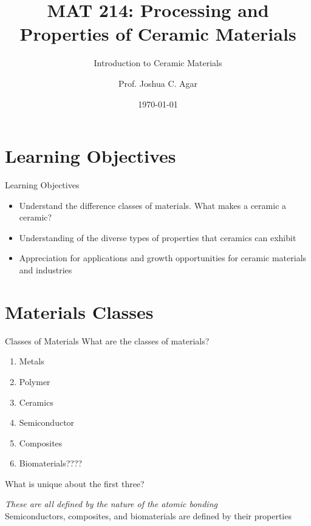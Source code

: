 \documentclass{libs/XJTLU_format}
\title[MAT 214 Spring 2022]{\textbf{MAT 214: Processing and Properties of Ceramic Materials}}
\subtitle{Introduction to Ceramic Materials}
\author{Prof. Joshua C. Agar}
\institute[Lehigh University]{
    \normalsize{\email{jca318@lehigh.edu}}
    \newline
    \department{Materials Science and Engineering}
    \newline
    \university{Lehigh University}
}
\date{\today}
\begin{document}


\begin{frame}{}
    \maketitle
\end{frame}

\section{Learning Objectives}
\begin{frame}{Learning Objectives}
    \begin{itemize}
    \item Understand the difference classes of materials. What makes a ceramic a ceramic?  \pause
    \item Understanding of the diverse types of properties that ceramics can exhibit  \pause
    \item Appreciation for applications and growth opportunities for ceramic materials and industries
\end{itemize}
\end{frame}


\section{Materials Classes}

\begin{frame}{Classes of Materials}
What are the classes of materials? 
\pause

\begin{enumerate}
    \item Metals \pause
    \item Polymer \pause
    \item Ceramics \pause
    \item Semiconductor \pause
    \item Composites \pause
    \item Biomaterials???? \pause
\end{enumerate}

\pause
What is unique about the first three? 

\pause
\hspace{1em}\emph{These are all defined by the nature of the atomic bonding}\\[0.1cm]

\pause
Semiconductors, composites, and biomaterials are defined by their properties

\end{frame}
\end{document}
